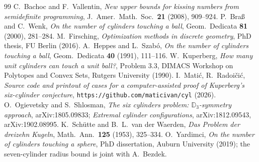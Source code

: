 \documentclass[reqno]{amsart}
\theoremstyle{definition}
\begin{document}
\begin{thebibliography}{99}
 C.~Bachoc and F.~Vallentin, \emph{New upper bounds for kissing numbers from semidefinite
programming}, J.\ Amer.\ Math.\ Soc.\ \textbf{21} (2008), 909--924.
 P.~Bra\ss{} and C.~Wenk, \emph{On the number of cylinders touching a ball}, Geom.\
Dedicata \textbf{81} (2000), 281--284.
 M.~Firsching, \emph{Optimization methods in discrete geometry}, PhD thesis, FU Berlin
(2016).
 A.~Heppes and L.~Szab\'o, \emph{On the number of cylinders touching a ball}, Geom.\
Dedicata \textbf{40} (1991), 111--116.
\bibitem{K} W.~Kuperberg, \emph{How many unit cylinders can touch a unit ball?}, Problem 3.3, DIMACS
Workshop on Polytopes and Convex Sets, Rutgers University (1990).
\bibitem{MRCode2026} I.~Mati\'c, R.~Radoi\v ci\'c, \emph{Source code and printout of cases for
a computer-assisted proof of Kuperberg's six-cylinder conjecture},
\verb+https://github.com/maticivan/cyl+ (2026).
\bibitem{OS} O.~Ogievetsky and S.~Shlosman, \emph{The six cylinders problem: $\mathbb{D}_3$-symmetry
approach}, arXiv:1805.09833; \emph{Extremal cylinder configurations}, arXiv:1812.09543,
arXiv:1902.08995.
\bibitem{SW} K.~Sch\"utte and B.~L.~van der Waerden, \emph{Das Problem der dreizehn Kugeln}, Math.\
Ann.\ \textbf{125} (1953), 325--334.
\bibitem{Yar} O.~Yardimci, \emph{On the number of cylinders touching a sphere}, PhD dissertation,
Auburn University (2019); the seven-cylinder radius bound is joint with A.~Bezdek.
\end{thebibliography}
\end{document}
